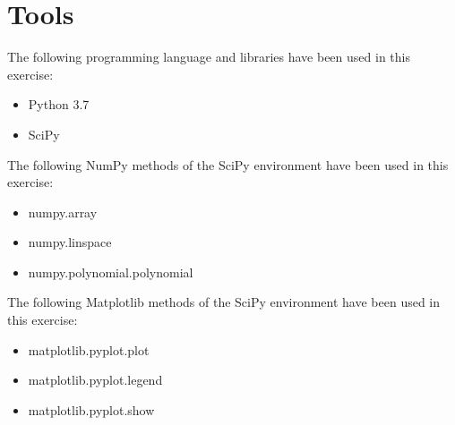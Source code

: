 \documentclass{article}
\begin{document}
\section{Tools}
The following programming language and libraries have been used in this exercise:
\begin{itemize}
  \item Python 3.7
  \item SciPy
\end{itemize}
The following NumPy methods of the SciPy environment have been used in this exercise:
\begin{itemize}
  \item numpy.array
  \item numpy.linspace
  \item numpy.polynomial.polynomial
  \end{itemize}
The following Matplotlib methods of the SciPy environment have been used in this exercise:
 \begin{itemize}
  \item matplotlib.pyplot.plot
  \item matplotlib.pyplot.legend
  \item matplotlib.pyplot.show
  \end{itemize}
\end{document}

